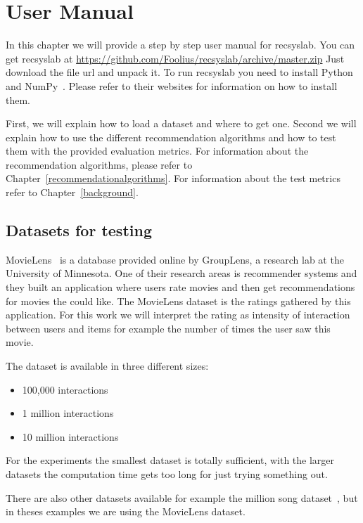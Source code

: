 \chapter{User Manual}
\label{usermanual}
In this chapter we will provide a step by step user manual for recsyslab.
You can get recsyslab at \url{https://github.com/Foolius/recsyslab/archive/master.zip}
Just download the file url and unpack it.
To run recsyslab you need to install Python~\cite{python} and NumPy~\cite{numpy}.
Please refer to their websites for information on how to install them.

First, we will explain how to load a dataset and where to get one. Second we
will explain how to use the different recommendation algorithms and
how to test them with the provided evaluation metrics. 
For information about the recommendation algorithms, please refer to Chapter~\ref{recommendationalgorithms}.
For information about the test metrics refer to Chapter~\ref{background}.

\section{Datasets for testing}
\label{movielens}

MovieLens~\cite{movielensdatasets} is a database provided online by GroupLens, a research
lab at the University of Minnesota. One of their research areas is
recommender systems and they built an application where users rate
movies and then get recommendations for movies the could like. The
MovieLens dataset is the ratings gathered by this application. For
this work we will interpret the rating as intensity of interaction
between users and items for example the number of times the user saw
this movie.

The dataset is available in three different sizes:
\begin{itemize}
\item 100,000 interactions
\item 1 million interactions
\item 10 million interactions
\end{itemize}
For the experiments the smallest dataset is totally sufficient, with
the larger datasets the computation time gets too long for just trying
something out.

There are also other datasets available for example the 
million song dataset~\cite{Bertin-Mahieux2011}, but in theses examples we are using the 
MovieLens dataset.

